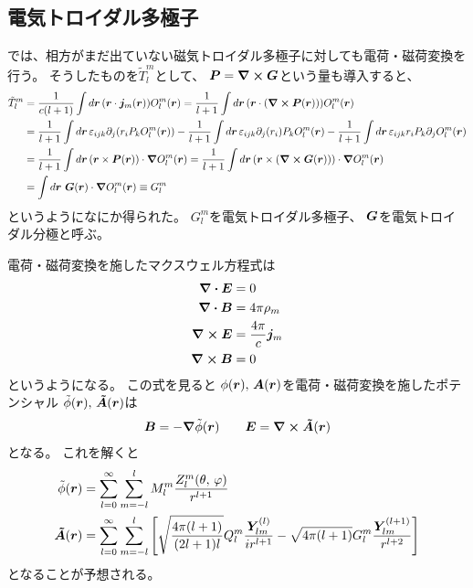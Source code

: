 \documentclass[../../master.tex]{subfiles}
\begin{document}
\subsection{電気トロイダル多極子}
では、相方がまだ出ていない磁気トロイダル多極子に対しても電荷・磁荷変換を行う。
そうしたものを\(\tilde{T}_l^m\)として、
\(\vb*{P} =\curl \vb*{G}\)という量も導入すると、
\begin{align}
    \tilde{T}_l^m
    &= \frac{1}{c(l+1)} \int d\vb*{r}\, (\vb*{r}\cdot \vb*{j}_m(\vb*{r}))O_l^m(\vb*{r})
    = \frac{1}{l+1} \int d\vb*{r}\, (\vb*{r}\cdot (\curl \vb*{P}(\vb*{r})))O_l^m(\vb*{r})\\
    &= \frac{1}{l+1} \int d\vb*{r}\, \varepsilon_{ijk} \partial_j(r_i P_k O_l^m(\vb*{r}))
    - \frac{1}{l+1} \int d\vb*{r}\, \varepsilon_{ijk} \partial_j(r_i) P_k O_l^m(\vb*{r})
    - \frac{1}{l+1} \int d\vb*{r}\, \varepsilon_{ijk} r_i P_k \partial_jO_l^m(\vb*{r})\\
    &= \frac{1}{l+1} \int d\vb*{r}\, (\vb*{r}\times \vb*{P}(\vb*{r})) \cdot \grad O_l^m(\vb*{r})
    = \frac{1}{l+1} \int d\vb*{r}\, (\vb*{r}\times (\curl \vb*{G}(\vb*{r}))) \cdot \grad O_l^m(\vb*{r})\\
    &= \int d\vb*{r}\, \,\vb*{G}(\vb*{r}) \cdot \grad O_l^m(\vb*{r})
    \equiv G_l^m
\end{align}
というようになにか得られた。
\(G_l^m\)を電気トロイダル多極子、
\(\vb*{G}\)を電気トロイダル分極と呼ぶ。

電荷・磁荷変換を施したマクスウェル方程式は
\begin{align}
    \div \vb*{E} &= 0\\
    \div \vb*{B} &= 4\pi \rho_m\\
    \curl \vb*{E} &= \frac{4\pi}{c}\vb*{j}_m\\
    \curl \vb*{B} &= 0
\end{align}
というようになる。
この式を見ると
\(\phi(\vb*{r}),\,\vb*{A}(\vb*{r})\)を電荷・磁荷変換を施したポテンシャル
\(\tilde{\phi}(\vb*{r}),\,\vb*{\tilde{A}}(\vb*{r})\)は
\begin{align}
    \vb*{B} = -\grad{\tilde{\phi}(\vb*{r})} \qquad
    \vb*{E} = \curl \vb*{\tilde{A}}(\vb*{r})
\end{align}
となる。
これを解くと
\begin{align}
    \tilde{\phi}(\vb*{r})
    &= \sum_{l=0}^{\infty} \sum_{m=-l}^{l} M_l^m \frac{Z_l^m(\theta,\,\varphi)}{r^{l+1}}\\
    \vb*{\tilde{A}}(\vb*{r})
    &= \sum_{l=0}^{\infty} \sum_{m=-l}^{l}\qty[
        \sqrt{\frac{4\pi(l+1)}{(2l+1)l}}Q_l^m \frac{\vb*{Y}_{lm}^{(l)}}{ir^{l+1}}
        -\sqrt{4\pi(l+1)} G_l^m \frac{\vb*{Y}_{lm}^{(l+1)}}{r^{l+2}}
    ]
\end{align}
となることが予想される。
\end{document}
